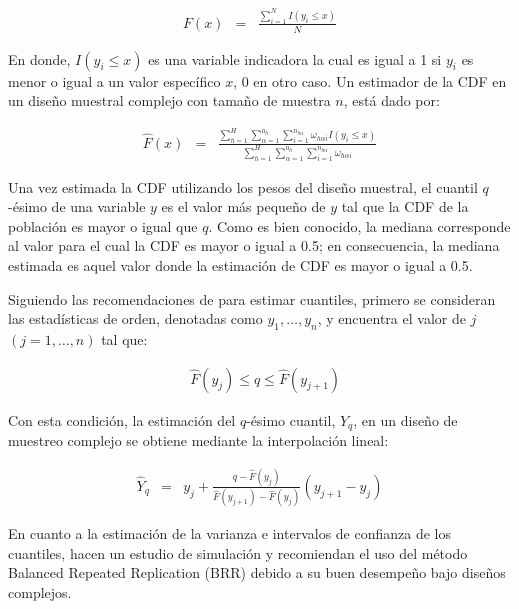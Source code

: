 \documentclass[
  spanish,
  12pt,
]{book}
\begin{document}
\begin{eqnarray*}
F\left(x\right) & = & \frac{{ \sum_{i=1}^{N}}I\left(y_{i}\leq x\right)}{N}
\end{eqnarray*}

En donde, \(I\left(y_{i}\leq x\right)\) es una variable indicadora la cual es igual a 1 si \(y_{i}\) es menor o igual a un valor específico \(x\), 0 en otro caso. Un estimador de la CDF en un diseño muestral complejo con tamaño de muestra \(n\), está dado por:

\begin{eqnarray*}
\hat{F}\left(x\right) & = & \frac{\sum_{h=1}^{H}\sum_{\alpha=1}^{a_{h}}\sum_{i=1}^{n_{h\alpha}}\omega_{h\alpha i}I\left(y_{i}\leq x\right)}{\sum_{h=1}^{H}\sum_{\alpha=1}^{a_{h}}\sum_{i=1}^{n_{h\alpha}}\omega_{h\alpha i}}
\end{eqnarray*}

Una vez estimada la CDF utilizando los pesos del diseño muestral, el cuantil \(q\)-ésimo de una variable \(y\) es el valor más pequeño de \(y\) tal que la CDF de la población es mayor o igual que \(q\). Como es bien conocido, la mediana corresponde al valor para el cual la CDF es mayor o igual a 0.5; en consecuencia, la mediana estimada es aquel valor donde la estimación de CDF es mayor o igual a 0.5.

Siguiendo las recomendaciones de \citet{heeringa2017applied} para estimar cuantiles, primero se consideran las estadísticas de orden, denotadas como \(y_{1},\ldots,y_{n}\), y encuentra el valor de \(j\) \((j=1,\ldots,n)\) tal que:

\begin{eqnarray*}
 & \hat{F}\left(y_{j}\right)\leq q\leq\hat{F}\left(y_{j+1}\right)
\end{eqnarray*}

Con esta condición, la estimación del \(q\)-ésimo cuantil, \(Y_{q}\), en un diseño de muestreo complejo se obtiene mediante la interpolación lineal:

\begin{eqnarray*}
\hat{Y}_{q} & = & y_{j}+\frac{q-\hat{F}\left(y_{j}\right)}{\hat{F}\left(y_{j+1}\right)-\hat{F}\left(y_{j}\right)}\left(y_{j+1}-y_{j}\right)
\end{eqnarray*}

En cuanto a la estimación de la varianza e intervalos de confianza de los cuantiles, \citet{kovar1988} hacen un estudio de simulación y recomiendan el uso del método Balanced Repeated Replication (BRR) debido a su buen desempeño bajo diseños complejos.
\end{document}
